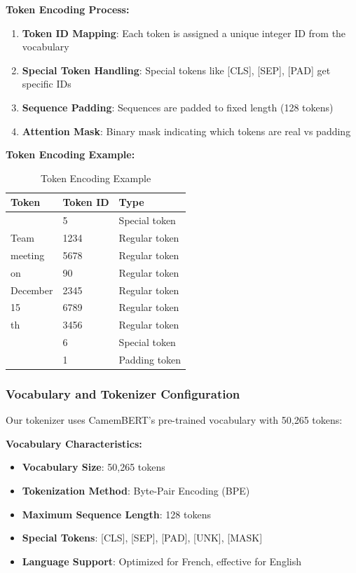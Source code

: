 \documentclass[12pt,a4paper]{article}
\begin{document}
\textbf{Token Encoding Process:}
\begin{enumerate}
    \item \textbf{Token ID Mapping}: Each token is assigned a unique integer ID from the vocabulary
    \item \textbf{Special Token Handling}: Special tokens like [CLS], [SEP], [PAD] get specific IDs
    \item \textbf{Sequence Padding}: Sequences are padded to fixed length (128 tokens)
    \item \textbf{Attention Mask}: Binary mask indicating which tokens are real vs padding
\end{enumerate}

\textbf{Token Encoding Example:}
\begin{table}[H]
\centering
\small
\begin{tabular}{|l|l|l|}
\hline
\textbf{Token} & \textbf{Token ID} & \textbf{Type} \\
\hline
[CLS] & 5 & Special token \\
\hline
Team & 1234 & Regular token \\
\hline
meeting & 5678 & Regular token \\
\hline
on & 90 & Regular token \\
\hline
December & 2345 & Regular token \\
\hline
15 & 6789 & Regular token \\
\hline
th & 3456 & Regular token \\
\hline
[SEP] & 6 & Special token \\
\hline
[PAD] & 1 & Padding token \\
\hline
\end{tabular}
\caption{Token Encoding Example}
\end{table}

\subsubsection{Vocabulary and Tokenizer Configuration}

Our tokenizer uses CamemBERT's pre-trained vocabulary with 50,265 tokens:

\textbf{Vocabulary Characteristics:}
\begin{itemize}
    \item \textbf{Vocabulary Size}: 50,265 tokens
    \item \textbf{Tokenization Method}: Byte-Pair Encoding (BPE)
    \item \textbf{Maximum Sequence Length}: 128 tokens
    \item \textbf{Special Tokens}: [CLS], [SEP], [PAD], [UNK], [MASK]
    \item \textbf{Language Support}: Optimized for French, effective for English
\end{itemize}
\end{document}
